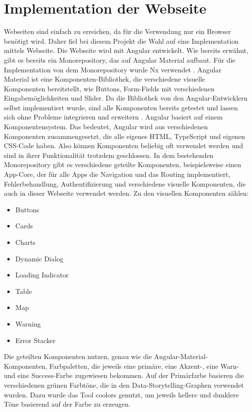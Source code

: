 \chapter{Implementation der Webseite}
Webseiten sind einfach zu erreichen, da für die Verwendung nur ein Browser benötigt wird. Daher fiel bei diesem Projekt die Wahl auf eine Implementation mittels Webseite. Die Webseite wird mit Angular entwickelt. Wie bereits erwähnt, gibt es bereits ein Monorepository, das auf Angular Material aufbaut. Für die Implementation von dem Monorepository wurde Nx verwendet \cite{Nx.}.  Angular Material ist eine Komponenten-Bibliothek, die verschiedene visuelle Komponenten bereitstellt, wie Buttons, Form-Fields mit verschiedenen Eingabemöglichkeiten und Slider. Da die Bibliothek von den Angular-Entwicklern selbst implementiert wurde, sind alle Komponenten bereits getestet und lassen sich ohne Probleme integrieren und erweitern \cite{Angular.2024}. Angular  basiert auf einem Komponentensystem. Das bedeutet, Angular wird aus verschiedenen Komponenten zusammengesetzt, die alle eigenes HTML, TypeScript und eigenen CSS-Code haben. Also können Komponenten beliebig oft verwendet werden und sind in ihrer Funktionalität trotzdem geschlossen. In dem bestehenden Monorepository gibt es verschiedene geteilte Komponenten, beispielsweise einen App-Core, der für alle Apps die Navigation und das Routing implementiert, Fehlerbehandlung, Authentifizierung und verschiedene visuelle Komponenten, die auch in dieser Webseite verwendet werden. Zu den visuellen Komponenten zählen:
\begin{multicols}{3}
    \begin{itemize}
        \item Buttons
        \item Cards
        \item Charts 
        \item Dynamic Dialog
        \item Loading Indicator
        \item Table
        \item Map
        \item Warning
        \item Error Stacker
    \end{itemize}
\end{multicols}
\noindent
Die geteilten Komponenten nutzen, genau wie die Angular-Material-Komponenten, Farbpaletten, die jeweils eine primäre, eine Akzent-, eine Warn- und eine Success-Farbe zugewiesen bekommen. Auf der Primärfarbe basieren die verschiedenen grünen Farbtöne, die in den Data-Storytelling-Graphen verwendet wurden. Dazu wurde das Tool coolors \cite{FabrizioBianchi.} genutzt, um jeweils hellere und dunklere Töne basierend auf der Farbe zu erzeugen.
